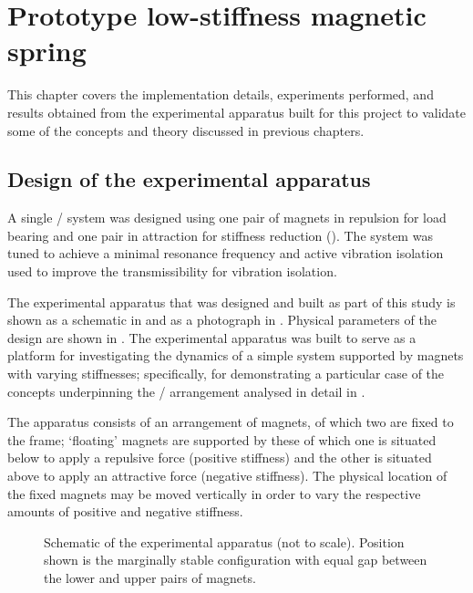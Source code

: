 \documentclass[11pt,a4paper]{memoir}
\begin{document}
\chapter{Prototype low-stiffness magnetic spring}


This chapter covers the implementation details, experiments performed, and results obtained from the experimental apparatus built for this project to validate some of the concepts and theory discussed in previous chapters.

\section{Design of the experimental apparatus}

A single \dof/ system was designed using one pair of magnets in repulsion for load bearing and one pair in attraction for stiffness reduction ().
The system was tuned to achieve a minimal resonance frequency and active vibration isolation used to improve the transmissibility for vibration isolation.

The experimental apparatus that was designed and built as part of this study
is shown as a schematic in  and as a photograph in
. Physical parameters of the design are shown in
. The experimental apparatus was built to serve as a platform for
investigating the dynamics of a simple system supported by magnets with
varying stiffnesses; specifically, for demonstrating a particular case of
the concepts underpinning the \qzs/ arrangement analysed in detail in .

The apparatus consists of an arrangement of magnets, of which two are
fixed to the frame; `floating' magnets are supported by these of which one
is situated below to apply a repulsive force (positive stiffness) and the
other is situated above to apply an attractive force (negative stiffness). The
physical location of the fixed magnets may be moved vertically in order to
vary the respective amounts of positive and negative stiffness.

\begin{figure}
  \begin{wide}
  \end{wide}
  \caption[Schematic of the experimental apparatus.]{
    Schematic of the experimental apparatus (not to scale). Position shown is
    the marginally stable configuration with equal gap between the lower
    and upper pairs of magnets.}
\end{figure}
\end{document}
